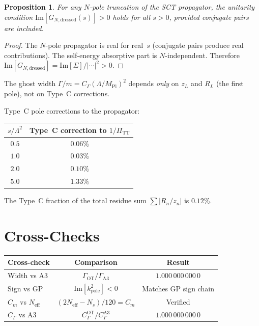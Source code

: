 \documentclass[11pt,a4paper]{article}
\newcommand{\PiTT}{\Pi_{\mathrm{TT}}}
\newcommand{\Imag}{\mathrm{Im}}
\newcommand{\MPl}{M_{\mathrm{Pl}}}
\newcommand{\Neff}{N_{\mathrm{eff}}}
\newtheorem{proposition}[theorem]{Proposition}
\begin{document}
\begin{proposition}
For any $N$-pole truncation of the SCT propagator, the unitarity condition
$\Imag[G_{N,\mathrm{dressed}}(s)] > 0$ holds for all $s > 0$, provided
conjugate pairs are included.
\end{proposition}

\begin{proof}
The $N$-pole propagator is real for real~$s$ (conjugate pairs produce
real contributions).  The self-energy absorptive part is $N$-independent.
Therefore $\Imag[G_{N,\mathrm{dressed}}] = \Imag[\Sigma]/|\cdots|^2 > 0$.
\end{proof}

The ghost width $\Gamma/m = C_\Gamma(\Lambda/\MPl)^2$ depends \emph{only}
on $z_L$ and $R_L$ (the first pole), not on Type~C corrections.

Type~C pole corrections to the propagator:
\begin{center}
\renewcommand{\arraystretch}{1.2}
\begin{tabular}{cc}
  \toprule
  $s/\Lambda^2$ & Type~C correction to $1/\PiTT$ \\
  \midrule
  $0.5$ & $0.06\%$ \\
  $1.0$ & $0.03\%$ \\
  $2.0$ & $0.10\%$ \\
  $5.0$ & $1.33\%$ \\
  \bottomrule
\end{tabular}
\end{center}

The Type~C fraction of the total residue sum $\sum|R_n/z_n|$ is $0.12\%$.


\section{Cross-Checks}

\begin{center}
\renewcommand{\arraystretch}{1.3}
\begin{tabular}{lcc}
  \toprule
  Cross-check & Comparison & Result \\
  \midrule
  Width vs A3 & $\Gamma_{\mathrm{OT}}/\Gamma_{\mathrm{A3}}$ & $1.000\,000\,000\,0$ \\
  Sign vs GP & $\Imag[k^2_{\mathrm{pole}}] < 0$ & Matches GP sign chain \\
  $C_m$ vs $\Neff$ & $(2\Neff - N_s)/120 = C_m$ & Verified \\
  $C_\Gamma$ vs A3 & $C_\Gamma^{\mathrm{OT}}/C_\Gamma^{\mathrm{A3}}$ & $1.000\,000\,000\,0$ \\
  \bottomrule
\end{tabular}
\end{center}
\end{document}

